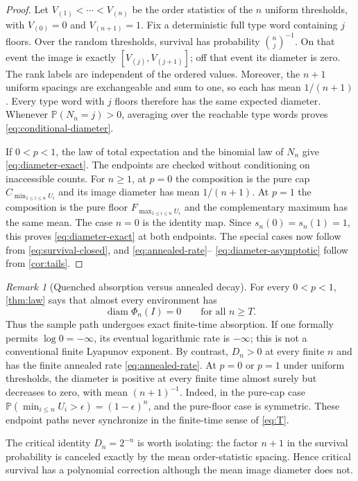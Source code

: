 \documentclass[11pt,a4paper]{amsart}
\theoremstyle{definition}
\theoremstyle{remark}
\newtheorem{remark}[theorem]{Remark}
\newcommand{\Prob}{\mathbb P}
\newcommand{\diameter}{\operatorname{diam}}
\begin{document}
\begin{proof}
Let $V_{(1)}<\cdots<V_{(n)}$ be the order statistics of the $n$ uniform
thresholds, with $V_{(0)}=0$ and $V_{(n+1)}=1$.  Fix a deterministic full
type word containing $j$ floors.  Over the random thresholds, survival has
probability $\binom nj^{-1}$.  On that event the image is exactly
$[V_{(j)},V_{(j+1)}]$; off that event its diameter is zero.  The rank labels
are independent of the ordered values.  Moreover, the $n+1$ uniform
spacings are exchangeable and sum to one, so each has mean $1/(n+1)$.
Every type word with $j$ floors therefore has the same expected diameter.
Whenever $\Prob(N_n=j)>0$, averaging over the reachable type words proves
\eqref{eq:conditional-diameter}.

If $0<p<1$, the law of total expectation and the binomial law of $N_n$ give
\eqref{eq:diameter-exact}.  The endpoints are checked without conditioning
on inaccessible counts.  For $n\geq1$, at $p=0$ the composition is the pure cap
$C_{\min_{1\leq i\leq n}U_i}$ and its image diameter has mean
$1/(n+1)$.  At $p=1$ the composition is the pure floor
$F_{\max_{1\leq i\leq n}U_i}$ and the complementary maximum has the same
mean.  The case $n=0$ is the identity map.  Since $s_n(0)=s_n(1)=1$, this
proves \eqref{eq:diameter-exact} at both endpoints.  The special cases now
follow from \eqref{eq:survival-closed}, and \eqref{eq:annealed-rate}--
\eqref{eq:diameter-asymptotic} follow from \cref{cor:tails}.
\end{proof}

\begin{remark}[Quenched absorption versus annealed decay]
\label{rem:quenched}
For every $0<p<1$, \cref{thm:law} says that almost every environment has
\[
 \diameter\Phi_n(I)=0\qquad\text{for all }n\geq T.
\]
Thus the sample path undergoes exact finite-time absorption.  If one
formally permits $\log0=-\infty$, its eventual logarithmic rate is
$-\infty$; this is not a conventional finite Lyapunov exponent.  By
contrast, $D_n>0$ at every finite $n$ and has the finite annealed rate
\eqref{eq:annealed-rate}.  At $p=0$ or $p=1$ under uniform thresholds, the
diameter is positive at every finite time almost surely but decreases to
zero, with mean $(n+1)^{-1}$.  Indeed, in the pure-cap case
$\Prob(\min_{i\leq n}U_i>\epsilon)=(1-\epsilon)^n$, and the pure-floor case
is symmetric.  These endpoint paths never synchronize in the finite-time
sense of \eqref{eq:T}.
\end{remark}

The critical identity $D_n=2^{-n}$ is worth isolating: the factor $n+1$ in
the survival probability is canceled exactly by the mean order-statistic
spacing.  Hence critical survival has a polynomial correction although the
mean image diameter does not.
\end{document}
